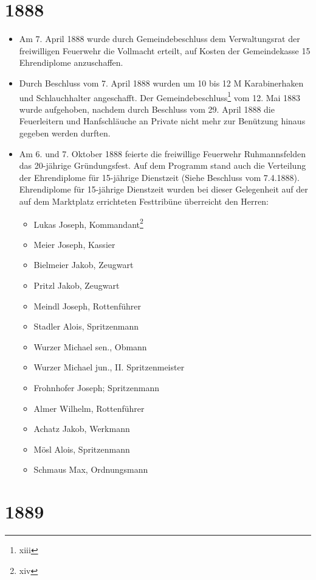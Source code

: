 \documentclass[12pt,a4paper]{book}
\begin{document}
\section*{1888}

\begin{itemize}
\item Am 7. April 1888 wurde durch Gemeindebeschluss dem Verwaltungsrat
der freiwilligen Feuerwehr die Vollmacht erteilt, auf Kosten der
Gemeindekasse 15 Ehrendiplome anzuschaffen.

\item Durch Beschluss vom 7. April 1888 wurden um 10 bis 12 M
Karabinerhaken und Schlauchhalter angeschafft. Der
Gemeindebeschluss\footnote{xiii} vom 12. Mai 1883 wurde aufgehoben,
nachdem durch Beschluss vom 29. April 1888 die Feuerleitern und
Hanfschläuche an Private nicht mehr zur Benützung hinaus gegeben werden
durften.

\item Am 6. und 7. Oktober 1888 feierte die freiwillige Feuerwehr
Ruhmannsfelden das 20-jährige Gründungsfest. Auf dem Programm stand auch
die Verteilung der Ehrendiplome für 15-jährige Dienstzeit (Siehe
Beschluss vom 7.4.1888). Ehrendiplome für 15-jährige Dienstzeit wurden
bei dieser Gelegenheit auf der auf dem Marktplatz errichteten
Festtribüne überreicht den Herren:

\begin{itemize}
\item Lukas Joseph, Kommandant\footnote{xiv}
\item Meier Joseph, Kassier
\item Bielmeier Jakob, Zeugwart
\item Pritzl Jakob, Zeugwart
\item Meindl Joseph, Rottenführer
\item Stadler Alois, Spritzenmann
\item Wurzer Michael sen., Obmann
\item Wurzer Michael jun., II. Spritzenmeister
\item Frohnhofer Joseph; Spritzenmann
\item Almer Wilhelm, Rottenführer
\item Achatz Jakob, Werkmann
\item Mösl Alois, Spritzenmann
\item Schmaus Max, Ordnungsmann
\end{itemize}
\end{itemize}

\section*{1889}
\end{document}
